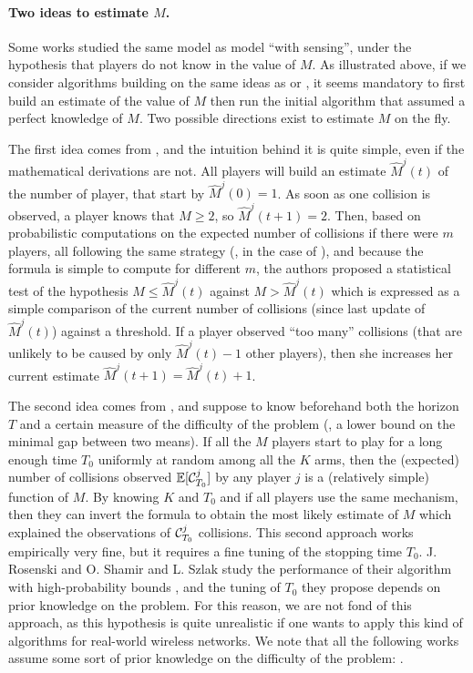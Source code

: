 \paragraph{Two ideas to estimate $M$.}

Some works studied the same model as model \modeldeux{} ``with sensing'', under the hypothesis that players do not know in the value of $M$.
As illustrated above, if we consider algorithms building on the same ideas as \RhoRand{} or \MCTopM, it seems mandatory to first build an estimate of the value of $M$ then run the initial algorithm that assumed a perfect knowledge of $M$.
Two possible directions exist to estimate $M$ on the fly.

The first idea comes from \cite{Anandkumar11}, and the intuition behind it is quite simple, even if the mathematical derivations are not.
All players will build an estimate $\widehat{M}^j(t)$ of the number of player, that start by $\widehat{M}^j(0)=1$. As soon as one collision is observed, a player knows that $M\geq2$, so $\widehat{M}^j(t+1) = 2$.
Then, based on probabilistic computations on the expected number of collisions if there were $m$ players, all following the same strategy (\eg, \RhoRand{} in the case of ), and because the formula is simple to compute for different $m$, the authors proposed a statistical test of the hypothesis $M \leq \widehat{M}^j(t)$ against $M > \widehat{M}^j(t)$ which is expressed as a simple comparison of the current number of collisions (since last update of $\widehat{M}^j(t)$) against a threshold.
If a player observed ``too many'' collisions (that are unlikely to be caused by only $\widehat{M}^j(t) - 1$ other players), then she increases her current estimate $\widehat{M}^j(t+1) = \widehat{M}^j(t) + 1$.

The second idea comes from \cite{Rosenski16}, and suppose to know beforehand both the horizon $T$ and a certain measure of the difficulty of the problem (\ie, a lower bound on the minimal gap between two means).
If all the $M$ players start to play for a long enough time $T_0$ uniformly at random among all the $K$ arms, then the (expected) number of collisions observed $\mathbb{E}[\mathcal{C}^j_{T_0}]$ by any player $j$ is a (relatively simple) function of $M$. By knowing $K$ and $T_0$ and if all players use the same mechanism, then they can invert the formula to obtain the most likely estimate of $M$ which explained the observations of $\mathcal{C}^j_{T_0}$ collisions.
This second approach works empirically very fine, but it requires a fine tuning of the stopping time $T_0$.
J. Rosenski and O. Shamir and L. Szlak study the performance of their algorithm with high-probability bounds \cite{Rosenski16}, and the tuning of $T_0$ they propose depends on prior knowledge on the problem.
%
For this reason, we are not fond of this approach, as this hypothesis is quite unrealistic if one wants to apply this kind of algorithms for real-world wireless networks.
We note that all the following works assume some sort of prior knowledge on the difficulty of the problem:
\cite{kumar2017channel,KumarYadav2018,SawantKumar2018,JoshiKumar2018,DarakHanawal18,KumarDarak2019,Tibrewal2019}.


